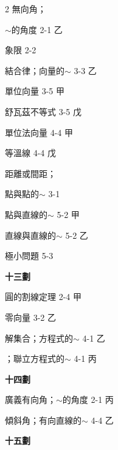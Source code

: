 \begin{multicols}{2}
\noindent 無向角；\par
\noindent\hspace*{1.5em} $\sim$的角度 \hfill 2-1 乙\par
\noindent 象限 \hfill 2-2\par
\noindent 結合律；向量的$\sim$ \hfill 3-3 乙\par
\noindent 單位向量 \hfill 3-5 甲\par
\noindent 舒瓦茲不等式 \hfill 3-5 戊\par
\noindent 單位法向量 \hfill 4-4 甲\par
\noindent 等溫線 \hfill 4-4 戊\par
\noindent 距離或間距；\par
\noindent\hspace*{1.5em} 點與點的$\sim$ \hfill 3-1\par
\noindent\hspace*{1.5em} 點與直線的$\sim$ \hfill 5-2 甲\par
\noindent\hspace*{1.5em} 直線與直線的$\sim$ \hfill 5-2 乙\par
\noindent 極小問題 \hfill 5-3\par

\vspace{0.8em}
\begin{center}
\textbf{\large 十三劃}
\end{center}

\noindent 圓的割線定理 \hfill 2-4 甲\par
\noindent 零向量 \hfill 3-2 乙\par
\noindent 解集合；方程式的$\sim$ \hfill 4-1 乙\par
\noindent\hspace*{1.5em} ；聯立方程式的$\sim$ \hfill 4-1 丙\par

\vspace{0.8em}
\begin{center}
\textbf{\large 十四劃}
\end{center}

\noindent 廣義有向角；$\sim$的角度 \hfill 2-1 丙\par
\noindent 傾斜角；有向直線的$\sim$ \hfill 4-4 乙\par

\vspace{0.8em}
\begin{center}
\textbf{\large 十五劃}
\end{center}


\end{multicols}
